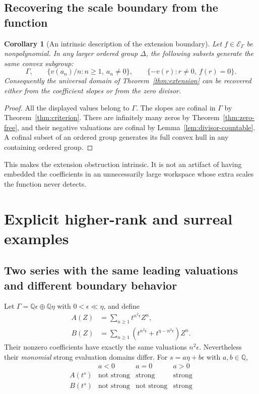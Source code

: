 \documentclass[11pt,letterpaper]{article}
\numberwithin{equation}{section}
\newtheorem{corollary}[theorem]{Corollary}
\theoremstyle{definition}
\theoremstyle{remark}
\newcommand{\Q}{\mathbb Q}
\begin{document}
\subsection{Recovering the scale boundary from the function}
\begin{corollary}[An intrinsic description of the extension boundary]
\label{cor:intrinsic-boundary}
Let $f\in\mathcal E_\Gamma$ be nonpolynomial. In any larger ordered group
$\Delta$, the following subsets generate the same convex subgroup:
\[
 \Gamma,\qquad
 \{v(a_n)/n:n\ge1,\ a_n\ne0\},\qquad
 \{-v(r):r\ne0,\ f(r)=0\}.
\]
Consequently the universal domain of Theorem~\ref{thm:extension} can be
recovered either from the coefficient slopes or from the zero divisor.
\end{corollary}
\begin{proof}
All the displayed values belong to $\Gamma$. The slopes are cofinal in
$\Gamma$ by Theorem~\ref{thm:criterion}. There are infinitely many zeros by
Theorem~\ref{thm:zero-free}, and their negative valuations are cofinal by
Lemma~\ref{lem:divisor-countable}. A cofinal subset of an ordered group
generates its full convex hull in any containing ordered group.
\end{proof}

This makes the extension obstruction intrinsic. It is not an artifact of
having embedded the coefficients in an unnecessarily large workspace whose
extra scales the function never detects.

\section{Explicit higher-rank and surreal examples}\label{sec:examples}

\subsection{Two series with the same leading valuations and different boundary behavior}
\label{subsec:hidden-tails}
Let $\Gamma=\Q\epsilon\oplus\Q\eta$ with $0<\epsilon\ll\eta$, and define
\begin{align}
 A(Z)&=\sum_{n\ge1}t^{n^2\epsilon}Z^n,\label{eq:hidden-A}\\
 B(Z)&=\sum_{n\ge1}
       \left(t^{n^2\epsilon}+t^{\eta-n^2\epsilon}\right)Z^n.
       \label{eq:hidden-B}
\end{align}
Their nonzero coefficients have exactly the same valuations $n^2\epsilon$.
Nevertheless their \emph{monomial} strong evaluation domains differ.
For $s=a\eta+b\epsilon$ with $a,b\in\Q$,
\begin{equation}\label{eq:hidden-profile}
 \begin{array}{c|ccc}
 &a<0&a=0&a>0\\\hline
 A(t^s)&\text{not strong}&\text{strong}&\text{strong}\\
 B(t^s)&\text{not strong}&\text{not strong}&\text{strong}
 \end{array}
\end{equation}
\end{document}
